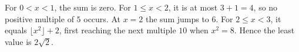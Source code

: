 For $0<x<1$, the sum is zero. For $1\le x<2$, it is at most $3+1=4$, so no positive multiple of $5$ occurs. At $x=2$ the sum jumps to $6$. For $2\le x<3$, it equals $\lfloor x^2\rfloor+2$, first reaching the next multiple $10$ when $x^2=8$. Hence the least value is $\boxed{2\sqrt2}$.
